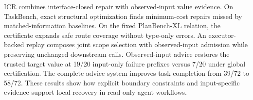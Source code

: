 ICR combines interface-closed repair with observed-input value evidence.
On TaskBench, exact structural optimization finds minimum-cost repairs missed
by matched-information baselines. On the fixed PlanBench-XL relation, the
certificate expands safe route coverage without type-only errors. An executor-
backed replay composes joint scope selection with observed-input admission
while preserving unchanged downstream calls.
Observed-input advice restores the trusted target value at 19/20 input-only failure prefixes
versus 7/20 under global certification. The complete advice system improves
task completion from 39/72 to 58/72. These results show how explicit boundary
constraints and input-specific evidence support local recovery in read-only
agent workflows.
